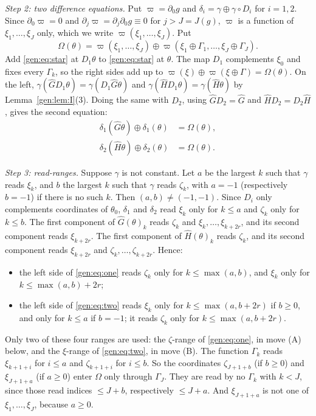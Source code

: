 \emph{Step 2: two difference equations.} Put $\varpi=\partial_0g$ and $\delta_i=\gamma\oplus\gamma\circ D_i$ for $i=1,2$. Since $\partial_0\varpi=0$ and $\partial_j\varpi=\partial_j\partial_0g\equiv0$ for $j>J=J(g)$, $\varpi$ is a function of $\xi_1,\dots,\xi_J$ only, which we write $\varpi(\xi_1,\dots,\xi_J)$. Put
\[
\Omega(\theta)=\varpi(\xi_1,\dots,\xi_J)\oplus\varpi(\xi_1\oplus\Gamma_1,\dots,\xi_J\oplus\Gamma_J).
\]
Add \eqref{gen:eq:star} at $D_1\theta$ to \eqref{gen:eq:star} at $\theta$. The map $D_1$ complements $\xi_0$ and fixes every $\Gamma_k$, so the right sides add up to $\varpi(\xi)\oplus\varpi(\xi\oplus\Gamma)=\Omega(\theta)$. On the left, $\gamma(\hat GD_1\theta)=\gamma(D_1\hat G\theta)$ and $\gamma(\hat HD_1\theta)=\gamma(\hat H\theta)$ by Lemma~\ref{gen:lem:I}(3). Doing the same with $D_2$, using $\hat GD_2=\hat G$ and $\hat HD_2=D_2\hat H$, gives the second equation:
\begin{align}
\delta_1(\hat G\theta)\oplus\delta_1(\theta)&=\Omega(\theta),\label{gen:eq:one}\\
\delta_2(\hat H\theta)\oplus\delta_2(\theta)&=\Omega(\theta).\label{gen:eq:two}
\end{align}

\emph{Step 3: read-ranges.} Suppose $\gamma$ is not constant. Let $a$ be the largest $k$ such that $\gamma$ reads $\xi_k$, and $b$ the largest $k$ such that $\gamma$ reads $\zeta_k$, with $a=-1$ (respectively $b=-1$) if there is no such $k$. Then $(a,b)\ne(-1,-1)$. Since $D_i$ only complements coordinates of $\theta_0$, $\delta_1$ and $\delta_2$ read $\xi_k$ only for $k\le a$ and $\zeta_k$ only for $k\le b$. The first component of $\hat G(\theta)_k$ reads $\zeta_k$ and $\xi_k,\dots,\xi_{k+2r}$, and its second component reads $\xi_{k+2r}$. The first component of $\hat H(\theta)_k$ reads $\zeta_k$, and its second component reads $\xi_{k+2r}$ and $\zeta_k,\dots,\zeta_{k+2r}$. Hence:
\begin{itemize}
\item the left side of \eqref{gen:eq:one} reads $\zeta_k$ only for $k\le\max(a,b)$, and $\xi_k$ only for $k\le\max(a,b)+2r$;
\item the left side of \eqref{gen:eq:two} reads $\xi_k$ only for $k\le\max(a,b+2r)$ if $b\ge0$, and only for $k\le a$ if $b=-1$; it reads $\zeta_k$ only for $k\le\max(a,b+2r)$.
\end{itemize}
Only two of these four ranges are used: the $\zeta$-range of \eqref{gen:eq:one}, in move (A) below, and the $\xi$-range of \eqref{gen:eq:two}, in move (B). The function $\Gamma_k$ reads $\xi_{k+1+i}$ for $i\le a$ and $\zeta_{k+1+i}$ for $i\le b$. So the coordinates $\zeta_{J+1+b}$ (if $b\ge0$) and $\xi_{J+1+a}$ (if $a\ge0$) enter $\Omega$ only through $\Gamma_J$. They are read by no $\Gamma_k$ with $k<J$, since those read indices $\le J+b$, respectively $\le J+a$. And $\xi_{J+1+a}$ is not one of $\xi_1,\dots,\xi_J$, because $a\ge0$.

